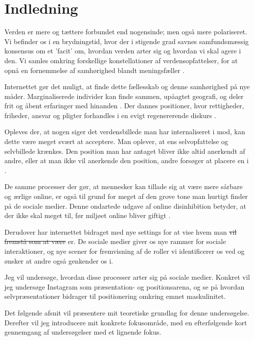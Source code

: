 \section{Indledning} 

Verden er mere og tættere forbundet end nogensinde; men også mere
polariseret. Vi befinder os i en brydningstid, hvor der i
stigende grad savnes samfundsmæssig konsensus om et 'facit'
om, hvordan verden arter sig og hvordan vi skal agere i den.  Vi
samles omkring forskellige konstellationer af verdensopfattelser,
for at opnå en fornemmelse af samhørighed blandt
meningsfæller \autocite{sulerUniqueGroupsCyberspace1999}.

Internettet gør det muligt, at finde dette fællesskab og denne
samhørighed på nye måder. Marginaliserede individer kan finde
sammen, upåagtet geografi, og deler frit og åbent erfaringer med
hinanden \autocite[s. 184]{sulerOnlineDisinhibitionEffect2004}. 
Der dannes positioner, hvor rettigheder, friheder, ansvar og
pligter forhandles i en evigt regenererende diskurs \autocite[s.
22]{harrePositioningTheoryMoral1999}.

Opleves der, at nogen siger det verdensbillede man har
internaliseret i mod, kan dette være meget svært at acceptere.
Man oplever, at ens selvopfattelse og selvbillede krænkes. Den
position man har antaget bliver ikke altid anerkendt af andre,
eller at man ikke vil anerkende den position, andre forsøger at
placere en i \autocite[s 30]{harrePositioningTheoryMoral1999}.

De samme processer der gør, at mennesker kan tillade sig at være
mere sårbare og ærlige online, er også til grund for meget af
den grove tone man hurtigt finder på de sociale medier. Denne 
ondartede udgave af online disinhibition betyder, at der ikke skal
meget til, før miljøet online bliver giftigt
\autocite{sulerOnlineDisinhibitionEffect2004}.

Derudover har internettet bidraget med nye settings for at vise 
hvem man \sout{vil fremstå som at være} er. De sociale medier 
giver os nye rammer for sociale interaktioner, og nye scener for 
fremvisning af de roller vi identificerer os ved og ønsker at 
andre også genkender os i.

Jeg vil undersøge, hvordan disse processer arter sig på sociale
medier. Konkret vil jeg undersøge Instagram som præsentation- og
positionsarena, og se på hvordan selvpræsentationer bidrager til 
positionering omkring emnet maskulinitet.

Det følgende afsnit vil præsentere mit teoretiske grundlag for
denne undersøgelse. Derefter vil jeg introducere mit konkrete
fokusområde, med en efterfølgende kort gennemgang af undersøgelser
med et lignende fokus.

